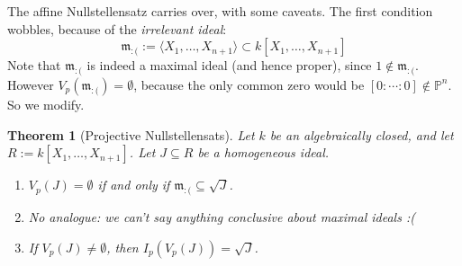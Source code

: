 \documentclass[12pt]{article}
\newcommand{\ita}[1]{\textit{#1}}
\newcommand{\vbrack}[1]{\langle #1\rangle}
\newtheorem{theorem}{Theorem}[section]
\theoremstyle{definition}
\begin{document}
The affine Nullstellensatz carries over, with some caveats. The first condition wobbles, because of the \ita{irrelevant ideal}:
\begin{equation}
    \mathfrak{m_{:(}}:=\vbrack{X_1,\dotsc,X_{n+1}}\subset k[X_1,\dotsc,X_{n+1}]
\end{equation}
Note that $\mathfrak{m}_{:(}$ is indeed a maximal ideal (and hence proper), since $1\notin\mathfrak{m}_{:(}$. However $V_p(\mathfrak{m}_{:(})=\emptyset$, because the only common zero would be $[0:\cdots:0]\notin\mathbb{P}^n$. So we modify. 
\begin{theorem}[Projective Nullstellensats]
    Let $k$ be an algebraically closed, and let $R:=k[X_1,\dotsc,X_{n+1}]$. Let $J\subseteq R$ be a homogeneous ideal.
    \begin{enumerate}
        \item $V_p(J)=\emptyset$ if and only if $\mathfrak{m}_{:(}\subseteq\sqrt{J}$.
        \item No analogue: we can't say anything conclusive about maximal ideals :(
        \item If $V_p(J)\neq\emptyset$, then $I_p(V_p(J))=\sqrt{J}$.
    \end{enumerate}
\end{theorem}
\end{document}
